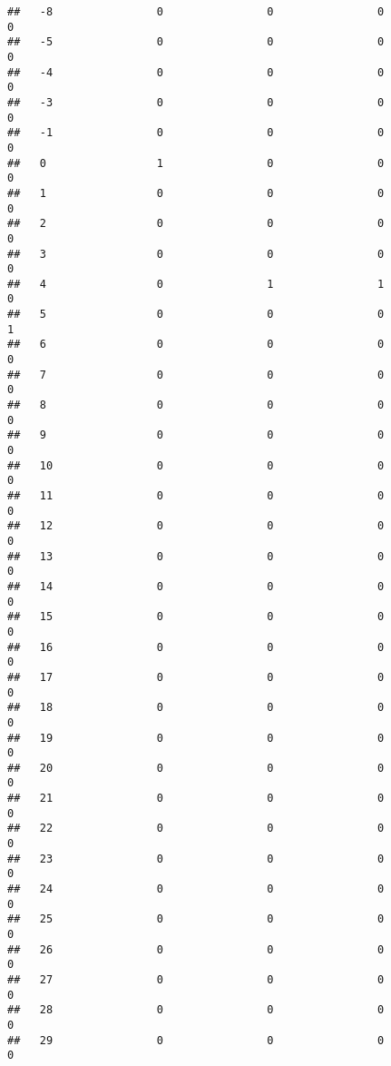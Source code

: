 \documentclass[]{article}
\begin{document}
\begin{verbatim}
##   -8                0                0                0               0
##   -5                0                0                0               0
##   -4                0                0                0               0
##   -3                0                0                0               0
##   -1                0                0                0               0
##   0                 1                0                0               0
##   1                 0                0                0               0
##   2                 0                0                0               0
##   3                 0                0                0               0
##   4                 0                1                1               0
##   5                 0                0                0               1
##   6                 0                0                0               0
##   7                 0                0                0               0
##   8                 0                0                0               0
##   9                 0                0                0               0
##   10                0                0                0               0
##   11                0                0                0               0
##   12                0                0                0               0
##   13                0                0                0               0
##   14                0                0                0               0
##   15                0                0                0               0
##   16                0                0                0               0
##   17                0                0                0               0
##   18                0                0                0               0
##   19                0                0                0               0
##   20                0                0                0               0
##   21                0                0                0               0
##   22                0                0                0               0
##   23                0                0                0               0
##   24                0                0                0               0
##   25                0                0                0               0
##   26                0                0                0               0
##   27                0                0                0               0
##   28                0                0                0               0
##   29                0                0                0               0

\end{verbatim}
\end{document}
